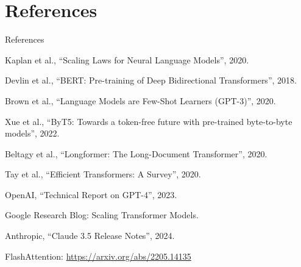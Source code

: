 \section{References}
\begin{frame}[allowframebreaks]{References}
\begin{thebibliography}{10}
Kaplan et al., ``Scaling Laws for Neural Language Models'', 2020.

Devlin et al., ``BERT: Pre-training of Deep Bidirectional Transformers'', 2018.

Brown et al., ``Language Models are Few-Shot Learners (GPT-3)'', 2020.

Xue et al., ``ByT5: Towards a token-free future with pre-trained byte-to-byte models'', 2022.

Beltagy et al., ``Longformer: The Long-Document Transformer'', 2020.

Tay et al., ``Efficient Transformers: A Survey'', 2020.

OpenAI, ``Technical Report on GPT-4'', 2023.

Google Research Blog: Scaling Transformer Models.

Anthropic, ``Claude 3.5 Release Notes'', 2024.

FlashAttention: \url{https://arxiv.org/abs/2205.14135}
\end{thebibliography}
\end{frame}